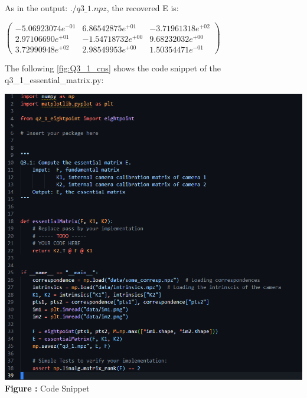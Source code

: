 \begin{your_solution}[title=Q3.1,height=12.5cm,width=\linewidth]
	As in the output: $./q3\_1.npz$, the recovered E is: 
	\newline
	
	$\begin{pmatrix}
	-5.06923074e^{-01} &  6.86542875e^{+01} & -3.71961318e^{+02}\\
	2.97106690e^{+01}  & -1.54718732e^{+00} &  9.68232032e^{+00}\\
	3.72990948e^{+02}  &  2.98549953e^{+00} &  1.50354471e^{-01}
	\end{pmatrix}$
	\newline
	
The following \autoref{fig:Q3_1_cns} shows the code snippet of the q3\_1\_essential\_matrix.py:
\newline


\begin{minipage}{1\linewidth}
	\centering
	\hspace{0.12\linewidth} 
	\includegraphics[width=0.5\linewidth]{../Q3_1_cns.png}  %
	\newline
	\textbf{Figure \thefigure:} Code Snippet %
	\label{fig:Q3_1_cns}  %
\end{minipage}

\end{your_solution}

